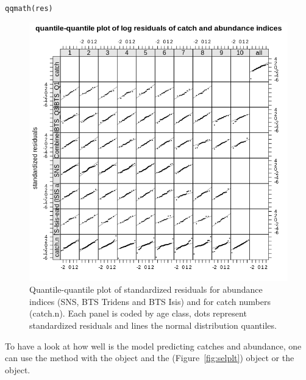 \documentclass[a4paper,english,10pt]{article}\usepackage[]{graphicx}\usepackage[]{color}
\makeatletter
\newcommand{\hlstd}[1]{\textcolor[rgb]{0.196,0.196,0.196}{#1}}%
\newcommand{\hlkwd}[1]{\textcolor[rgb]{0.78,0.227,0.412}{#1}}%
\newenvironment{kframe}{%
 \def\at@end@of@kframe{}%
 \ifinner\ifhmode%
  \def\at@end@of@kframe{\end{minipage}}%
  \begin{minipage}{\columnwidth}%
 \fi\fi%
 \def\FrameCommand##1{\hskip\@totalleftmargin \hskip-\fboxsep
 \colorbox{shadecolor}{##1}\hskip-\fboxsep
     \hskip-\linewidth \hskip-\@totalleftmargin \hskip\columnwidth}%
 \MakeFramed {\advance\hsize-\width
   \@totalleftmargin\z@ \linewidth\hsize
   \@setminipage}}%
 {\par\unskip\endMakeFramed%
 \at@end@of@kframe}
\newenvironment{knitrout}{}{} %
\makeatother
\begin{document}
\begin{knitrout}
\color{fgcolor}\begin{kframe}
\begin{alltt}
\hlkwd{qqmath}\hlstd{(res)}
\end{alltt}
\end{kframe}\begin{figure}[H]

{\centering \includegraphics[width=.9\linewidth]{figure/qq-1} 

}

\caption[Quantile-quantile plot of standardized residuals for abundance indices (SNS, BTS Tridens and BTS Isis) and for catch numbers (catch.n)]{Quantile-quantile plot of standardized residuals for abundance indices (SNS, BTS Tridens and BTS Isis) and for catch numbers (catch.n). Each panel is coded by age class, dots represent standardized residuals and lines the normal distribution quantiles.}\label{fig:qq}
\end{figure}


\end{knitrout}

To have a look at how well is the model predicting catches and abundance, one can use the  method with the  object and the  (Figure~\ref{fig:selplt}) object or the  object.
\end{document}
